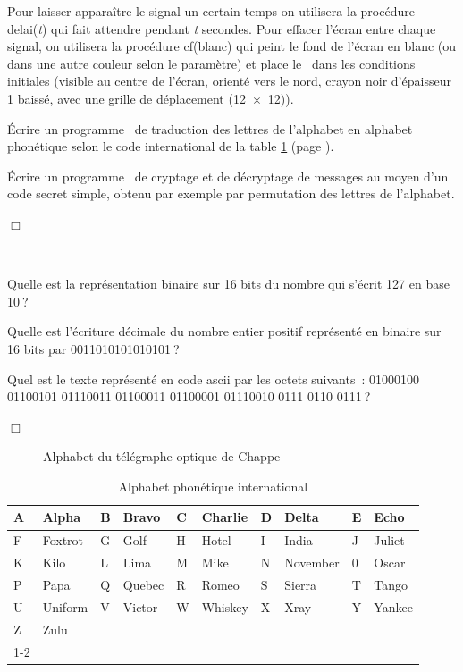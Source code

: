 \begin{exercices}
{  Pour laisser apparaître le signal un certain temps on utilisera la pro\-cé\-du\-re 
  {\idt delai({\rm\em t})} qui fait attendre pendant {\rm\em t} secondes. Pour effacer l'écran
  entre chaque signal, on utilisera la procédure {\idt cf(blanc)} qui peint le fond de l'écran
  en blanc (ou dans une autre couleur selon le paramètre) et place le \robot\ dans les conditions initiales
  (visible au centre de l'écran, or\-ien\-té vers le nord, crayon noir d'épaisseur 1 baissé, avec une grille 
  de déplacement (12~$\times$~12)).

  \tiret Écrire un programme \python\ de traduction des lettres de l'alphabet en alphabet phonétique
  selon le code international de la table \ref{tab:alphone} (page \pageref{tab:alphone}).

   \tiret Écrire un programme \python\ de cryptage et de décryptage de messages au moyen d'un code secret
   simple, obtenu par exemple par permutation des lettres de l'alphabet.

\noindent $\Box$}\end{exercices}
\begin{exercices}{\ \\
\vspace{-\baselineskip}

\tiret Quelle est la représentation binaire sur 16 bits du nombre qui s'écrit 127 
en base 10$\:$?

\tiret Quelle est l'écriture décimale du nombre entier positif re\-pré\-sen\-té
en binaire sur 16 bits par  0011010101010101$\:$?

\tiret Quel est le texte représenté en code {\sc ascii} par les octets suivants~:
01000100 01100101 01110011 01100011 01100001
01110010 0111 0110 0111$\:$?

\noindent $\Box$}\end{exercices}
\begin{figure}[htbp]
 \caption{Alphabet du télégraphe optique de Chappe}\label{fig:chappe}
\end{figure}
\begin{table}[htbp]
\begin{center}
\begin{tabular}{@{}|l|l||l|l||l|l||l|l||l|l|@{}} \hline
A & Alpha   & B  & Bravo & C & Charlie & D & Delta   & E  & Echo \\\hline
F & Foxtrot  & G & Golf   & H  & Hotel & I & India & J & Juliet \\\hline
K  & Kilo & L & Lima & M & Mike   & N  & November & 0 & Oscar \\\hline
P & Papa   & Q  & Quebec & R & Romeo  & S & Sierra   & T  & Tango \\\hline
U & Uniform & V & Victor   & W  & Whiskey & X & Xray & Y & Yankee   \\\hline
Z  & Zulu &   \multicolumn{8}{c}{}   \\\cline{1-2}
\end{tabular}
\end{center}
\caption{Alphabet phonétique international}\label{tab:alphone}
\end{table}
